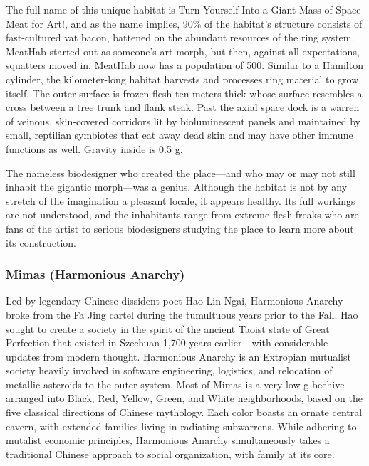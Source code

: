The full name of this unique habitat is Turn Yourself Into a Giant Mass of Space Meat for Art!, and as the name implies, 90\% of the habitat's structure consists of fast-cultured vat bacon, battened on the abundant resources of the ring system. MeatHab started out as someone's art morph, but then, against all expectations, squatters moved in. MeatHab now has a population of 500. Similar to a Hamilton cylinder, the kilometer-long habitat harvests and processes ring material to grow itself. The outer surface is frozen flesh ten meters thick whose surface resembles a cross between a tree trunk and flank steak. Past the axial space dock is a warren of veinous, skin-covered corridors lit by bioluminescent panels and maintained by small, reptilian symbiotes that eat away dead skin and may have other immune functions as well. Gravity inside is 0.5 g. 

The nameless biodesigner who created the place—and who may or may not still inhabit the gigantic morph—was a genius. Although the habitat is not by any stretch of the imagination a pleasant locale, it appears healthy. Its full workings are not understood, and the inhabitants range from extreme flesh freaks who are fans of the artist to serious biodesigners studying the place to learn more about its construction. 

\subsubsection{Mimas (Harmonious Anarchy)} \label{sec:mimas-harm-anarchy} 

Led by legendary Chinese dissident poet Hao Lin Ngai, Harmonious Anarchy broke from the Fa Jing cartel during the tumultuous years prior to the Fall. Hao sought to create a society in the spirit of the ancient Taoist state of Great Perfection that existed in Szechuan 1,700 years earlier—with considerable updates from modern thought. Harmonious Anarchy is an Extropian mutualist society heavily involved in software engineering, logistics, and relocation of metallic asteroids to the outer system. Most of Mimas is a very low-g beehive arranged into Black, Red, Yellow, Green, and White neighborhoods, based on the five classical directions of Chinese mythology. Each color boasts an ornate central cavern, with extended families living in radiating subwarrens. While adhering to mutalist economic principles, Harmonious Anarchy simultaneously takes a traditional Chinese approach to social organization, with family at its core. 

